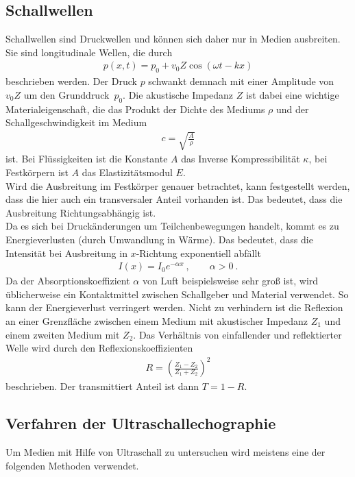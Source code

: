 \subsection{Schallwellen}
Schallwellen sind Druckwellen und können sich daher nur in Medien ausbreiten. Sie sind longitudinale Wellen, die durch
\begin{align}
	p(x, t) = p_0 + v_0 Z \cos(\omega t-kx)
\end{align}
beschrieben werden. Der Druck $p$ schwankt demnach mit einer Amplitude von $v_0Z$ um den \grqq Grunddruck\grqq\ $p_0$. Die akustische Impedanz $Z$ ist dabei eine wichtige Materialeigenschaft, die das Produkt der Dichte des Mediums $\rho$ und der Schallgeschwindigkeit im Medium
\begin{align}
	c = \sqrt{\frac{A}{\rho}}
\end{align}
ist. Bei Flüssigkeiten ist die Konstante $A$ das Inverse Kompressibilität $\kappa$, bei Festkörpern ist $A$ das Elastizitätsmodul $E$. \\
Wird die Ausbreitung im Festkörper genauer betrachtet, kann festgestellt werden, dass die hier auch ein transversaler Anteil vorhanden ist. Das bedeutet, dass die Ausbreitung Richtungsabhängig ist.  \\
Da es sich bei Druckänderungen um Teilchenbewegungen handelt, kommt es zu Energieverlusten (durch Umwandlung in Wärme). Das bedeutet, dass die Intensität bei Ausbreitung in $x$-Richtung exponentiell abfällt
\begin{align}
	I(x) = I_0 e^{-\alpha x} \ ,\qquad \alpha>0 \ .
\end{align}
Da der Absorptionskoeffizient $\alpha$ von Luft beispielsweise sehr groß ist, wird üblicherweise ein Kontaktmittel zwischen Schallgeber und Material verwendet. So kann der Energieverlust verringert werden. Nicht zu verhindern ist die Reflexion an einer Grenzfläche zwischen einem Medium mit akustischer Impedanz $Z_1$ und einem zweiten Medium mit $Z_2$. Das Verhältnis von einfallender und reflektierter Welle wird durch den Reflexionskoeffizienten
\begin{align}
	R = \left(\frac{Z_1-Z_2}{Z_1+Z_2}\right)^2
\end{align}
beschrieben. Der transmittiert Anteil ist dann $T = 1-R$.
\subsection{Verfahren der Ultraschallechographie}
Um Medien mit Hilfe von Ultraschall zu untersuchen wird meistens eine der folgenden Methoden verwendet.
